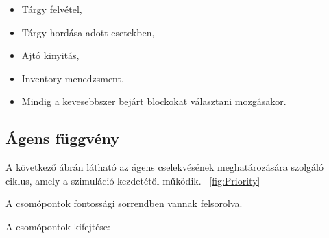 \begin{itemize}
    \item Tárgy felvétel,
    \item Tárgy hordása adott esetekben,
    \item Ajtó kinyitás,
    \item Inventory menedzsment,
    \item Mindig a kevesebbszer bejárt blockokat választani mozgásakor.
\end{itemize}

\subsection{Ágens függvény}

A következő ábrán látható az ágens cselekvésének meghatározására szolgáló ciklus, amely a szimuláció kezdetétől működik. ~\ref{fig:Priority}

A csomópontok fontossági sorrendben vannak felsorolva.

\noindent A csomópontok kifejtése:

